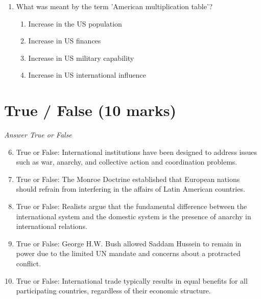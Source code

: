 \documentclass[12pt]{article}
\begin{document}
\begin{enumerate}[label=\arabic*.]
\begin{enumerate}[label=(\alph*)]
    \item Societal groups have a right to survive.
    \item Societal groups have their own reality.
    \item Societal groups are constituted by social interaction.
    \item Societal groups are multiple-identity units.
\end{enumerate}
\item What was meant by the term 'American multiplication table'?
\begin{enumerate}[label=(\alph*)]
    \item Increase in the US population
    \item Increase in US finances
    \item Increase in US military capability
    \item Increase in US international influence
\end{enumerate}
\end{enumerate}

\section*{True / False (10 marks)}
\textit{Answer True or False}
\begin{enumerate}[label=\arabic*.]
\setcounter{enumi}{5}
\item True or False: International institutions have been designed to address issues such as war, anarchy, and collective action and coordination problems.
\item True or False: The Monroe Doctrine established that European nations should refrain from interfering in the affairs of Latin American countries.
\item True or False: Realists argue that the fundamental difference between the international system and the domestic system is the presence of anarchy in international relations.
\item True or False: George H.W. Bush allowed Saddam Hussein to remain in power due to the limited UN mandate and concerns about a protracted conflict.
\item True or False: International trade typically results in equal benefits for all participating countries, regardless of their economic structure.
\end{enumerate}
\end{document}
